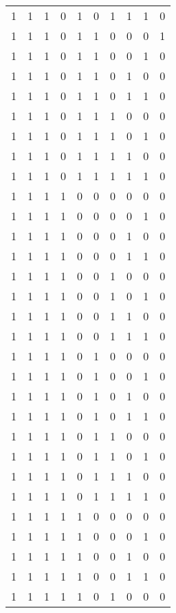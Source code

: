 \begin{longtable}[c]{rrrrrrrrrr}
        1 & 1 & 1 & 0 & 1 & 0 & 1 & 1 & 1 & 0 \\
        1 & 1 & 1 & 0 & 1 & 1 & 0 & 0 & 0 & 1 \\
        1 & 1 & 1 & 0 & 1 & 1 & 0 & 0 & 1 & 0 \\
        1 & 1 & 1 & 0 & 1 & 1 & 0 & 1 & 0 & 0 \\
        1 & 1 & 1 & 0 & 1 & 1 & 0 & 1 & 1 & 0 \\
        1 & 1 & 1 & 0 & 1 & 1 & 1 & 0 & 0 & 0 \\
        1 & 1 & 1 & 0 & 1 & 1 & 1 & 0 & 1 & 0 \\
        1 & 1 & 1 & 0 & 1 & 1 & 1 & 1 & 0 & 0 \\
        1 & 1 & 1 & 0 & 1 & 1 & 1 & 1 & 1 & 0 \\
        1 & 1 & 1 & 1 & 0 & 0 & 0 & 0 & 0 & 0 \\
        1 & 1 & 1 & 1 & 0 & 0 & 0 & 0 & 1 & 0 \\
        1 & 1 & 1 & 1 & 0 & 0 & 0 & 1 & 0 & 0 \\
        1 & 1 & 1 & 1 & 0 & 0 & 0 & 1 & 1 & 0 \\
        1 & 1 & 1 & 1 & 0 & 0 & 1 & 0 & 0 & 0 \\
        1 & 1 & 1 & 1 & 0 & 0 & 1 & 0 & 1 & 0 \\
        1 & 1 & 1 & 1 & 0 & 0 & 1 & 1 & 0 & 0 \\
        1 & 1 & 1 & 1 & 0 & 0 & 1 & 1 & 1 & 0 \\
        1 & 1 & 1 & 1 & 0 & 1 & 0 & 0 & 0 & 0 \\
        1 & 1 & 1 & 1 & 0 & 1 & 0 & 0 & 1 & 0 \\
        1 & 1 & 1 & 1 & 0 & 1 & 0 & 1 & 0 & 0 \\
        1 & 1 & 1 & 1 & 0 & 1 & 0 & 1 & 1 & 0 \\
        1 & 1 & 1 & 1 & 0 & 1 & 1 & 0 & 0 & 0 \\
        1 & 1 & 1 & 1 & 0 & 1 & 1 & 0 & 1 & 0 \\
        1 & 1 & 1 & 1 & 0 & 1 & 1 & 1 & 0 & 0 \\
        1 & 1 & 1 & 1 & 0 & 1 & 1 & 1 & 1 & 0 \\
        1 & 1 & 1 & 1 & 1 & 0 & 0 & 0 & 0 & 0 \\
        1 & 1 & 1 & 1 & 1 & 0 & 0 & 0 & 1 & 0 \\
        1 & 1 & 1 & 1 & 1 & 0 & 0 & 1 & 0 & 0 \\
        1 & 1 & 1 & 1 & 1 & 0 & 0 & 1 & 1 & 0 \\
        1 & 1 & 1 & 1 & 1 & 0 & 1 & 0 & 0 & 0 \\

\end{longtable}
